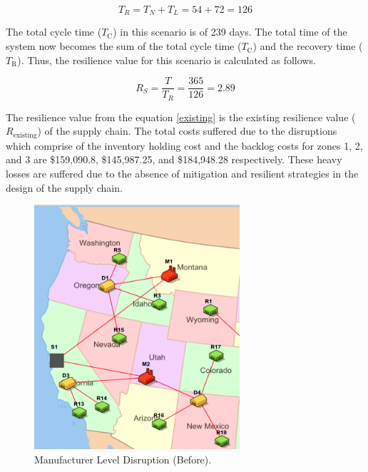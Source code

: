 \begin{equation}
    T_R = T_N + T_L = 54 + 72 = 126  \label{3.3}
\end{equation}

The total cycle time ($T_{\text{C}}$) in this scenario is of 239 days. The total time of the system now becomes the sum of the total cycle time ($T_{\text{C}}$) and the recovery time ($T_{\text{R}}$). Thus, the resilience value for this scenario is calculated as follows.

\begin{equation}
  R_S = \frac{T}{T_R} = \frac{365}{126} = 2.89  \label{existing}
\end{equation}

The resilience value from the equation \ref{existing} is the existing resilience value ($R_{\text{existing}}$) of the supply chain. The total costs suffered due to the disruptions which comprise of the inventory holding cost and the backlog costs for zones 1, 2, and 3 are \$159,090.8, \$145,987.25, and \$184,948.28 respectively. These heavy losses are suffered due to the absence of mitigation and resilient strategies in the design of the supply chain.

 \begin{figure}[H]
   \centering
    \includegraphics[width=3.0in]{figures/pdf/BeforeM.png} 
    \caption{Manufacturer Level Disruption (Before).}
    \label{fig:MLDb}
\end{figure}

